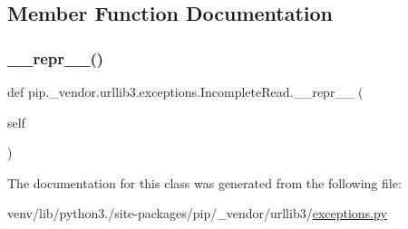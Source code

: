 \subsection{Member Function Documentation}
\mbox{\label{classpip_1_1__vendor_1_1urllib3_1_1exceptions_1_1IncompleteRead_a1b03e29e6ae19d82640c2c4685c57ee5}} 
\subsubsection{\texorpdfstring{\+\_\+\+\_\+repr\+\_\+\+\_\+()}{\_\_repr\_\_()}}
{\footnotesize\ttfamily def pip.\+\_\+vendor.\+urllib3.\+exceptions.\+Incomplete\+Read.\+\_\+\+\_\+repr\+\_\+\+\_\+ (\begin{DoxyParamCaption}\item[{}]{self }\end{DoxyParamCaption})}



The documentation for this class was generated from the following file\+:\begin{DoxyCompactItemize}
\item 
venv/lib/python3./site-\/packages/pip/\+\_\+vendor/urllib3/\hyperlink{pip_2__vendor_2urllib3_2exceptions_8py}{exceptions.\+py}\end{DoxyCompactItemize}

